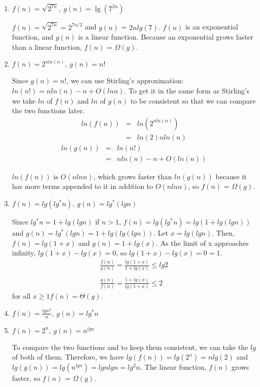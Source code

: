 \documentclass{article}
\begin{document}
\begin{enumerate}
\item $f(n) = \sqrt{2^{7n}},\ g(n) = \lg({7^{2n}})$

$f(n) = \sqrt{2^{7n}} = 2^{7n/2}$ and $g(n)$ = $2n lg(7)$. $f(n)$ is an exponential function, and $g(n)$ is a linear function. Because an exponential grows faster than a linear function, $f(n)$ = $\Omega(g)$. 

\item $f(n) = 2^{nln(n)},\ g(n) = n!$

Since $g(n) = n!$, we can use Stirling's approximation: $ln(n!) = n ln(n) - n + O(ln n)$. To get it in the same form as Stirling's we take $ln$ of $f(n)$ and $ln$ of $g(n)$ to be consistent so that we can compare the two functions later.
\begin{eqnarray*}
	ln(f(n)) &=& ln(2^{nln(n)}) \\
		&=& ln(2)nln(n)
\end{eqnarray*}
\begin{eqnarray*}
	ln(g(n)) &=& ln(n!) \\
		&=& nln(n)-n+O(ln(n))	
\end{eqnarray*}

$ln(f(n))$ is $O(nlnn)$, which grows faster than $ln(g(n))$ because it has more terms appended to it in addition to $O(nlnn)$, so $f(n)$ = $\Omega(g)$.

\item $f(n) = lg(lg^*n),\  g(n) = lg^*(lgn)$

Since $lg^*n = 1+lg(lgn)$ if $n>1$, $f(n)=lg(lg^*n)=lg(1+lg(lgn))$ and $g(n)=lg^*(lgn)=1+lg(lg(lgn))$. Let $x=lg(lgn)$. Then, $f(n)=lg(1+x)$ and $g(n)=1+lg(x)$. As the limit of x approaches infinity, $lg(1+x)-lg(x)=0$, so $lg(1+x)-lg(x)=0=1$.
\begin{eqnarray*}
	\frac{f(n)}{g(n)} = \frac{lg(1+x)}{1+lg(x)} \leq lg2
	\\\\
	\frac{g(n)}{f(n)} = \frac{1+lg(x)}{lg(1+x)} \leq 2
\end{eqnarray*}
for all $x\geq1 f(n)=\Theta(g)$.


\item $f(n) = \frac{lgn^2}{n},\ g(n) = lg^*n$

\item $f(n) = 2^n,\ g(n) = n^{lgn}$

To compare the two functions and to keep them consistent, we can take the $lg$ of both of them. Therefore, we have $lg(f(n))=lg(2^n)=nlg(2)$ and $lg(g(n))=lg(n^{lgn})=lgnlgn=lg^2n$. The linear function, $f(n)$ grows faster, so $f(n)$ = $\Omega(g)$.


\end{enumerate}
\end{document}
